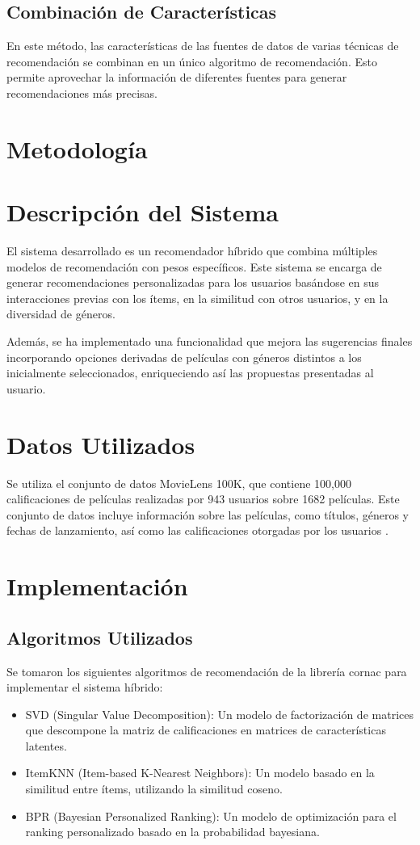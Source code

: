 \documentclass[runningheads]{llncs}
\begin{document}
        \subsection{Combinación de Características}
En este método, las características de las fuentes de datos de varias técnicas de recomendación se combinan en un único algoritmo de recomendación. Esto permite aprovechar la información de diferentes fuentes para generar recomendaciones más precisas.
\section{Metodología}
\section{Descripción del Sistema}
El sistema desarrollado es un recomendador híbrido que combina múltiples modelos de recomendación con pesos específicos. Este sistema se encarga de generar recomendaciones personalizadas para los usuarios basándose en sus interacciones previas con los ítems, en la similitud con otros usuarios, y en la diversidad de géneros. 

Además, se ha implementado una funcionalidad que mejora las sugerencias finales incorporando opciones derivadas de películas con géneros distintos a los inicialmente seleccionados, enriqueciendo así las propuestas presentadas al usuario.\section{Datos Utilizados}
Se utiliza el conjunto de datos MovieLens 100K, que contiene 100,000 calificaciones de películas realizadas por 943 usuarios sobre 1682 películas. Este conjunto de datos incluye información sobre las películas, como títulos, géneros y fechas de lanzamiento, así como las calificaciones otorgadas por los usuarios \cite{movielens}.

\section{Implementación}
\subsection{Algoritmos Utilizados}
Se tomaron los siguientes algoritmos de recomendación de la librería cornac \cite{cornac} para implementar el sistema híbrido:
\begin{itemize}
    \item SVD (Singular Value Decomposition): Un modelo de factorización de matrices que descompone la matriz de calificaciones en matrices de características latentes.
    \item ItemKNN (Item-based K-Nearest Neighbors): Un modelo basado en la similitud entre ítems, utilizando la similitud coseno.
    \item BPR (Bayesian Personalized Ranking): Un modelo de optimización para el ranking personalizado basado en la probabilidad bayesiana.
\end{itemize}
\end{document}
